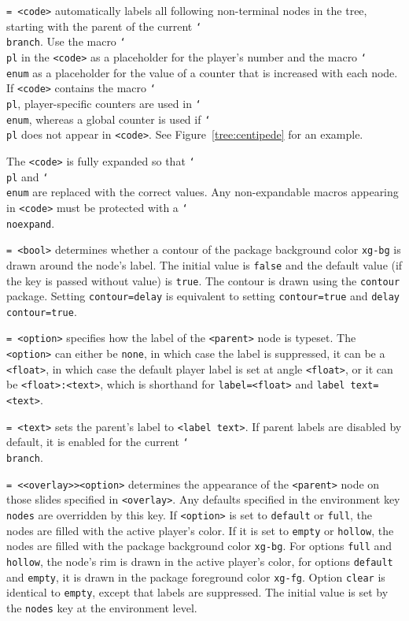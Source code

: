 \documentclass{article}
\newenvironment{desc}{\itemize[leftmargin=50pt]}{\enditemize}
\def\option#1#2{\item[\texttt{#1}] \hskip-1.5pt\texttt{#2}}
\renewcommand{\textbackslash}{\char`\\}
\def\cmd#1{\texttt{\color{cmd}\textbackslash#1}}
\begin{document}
\begin{desc}
\option{autolabel}{= <code>} automatically labels all following non-terminal nodes in the tree, starting with the parent of the current \cmd{branch}. Use the macro \cmd{pl} in the \texttt{<code>} as a placeholder for the player's number and the macro \cmd{enum} as a placeholder for the value of a counter that is increased with each node. If \texttt{<code>} contains the macro \cmd{pl}, player-specific counters are used in \cmd{enum}, whereas a global counter is used if \cmd{pl} does not appear in \texttt{<code>}. See Figure~\ref{tree:centipede} for an example.

{\color{player4}The \texttt{<code>} is fully expanded so that \cmd{pl} and \cmd{enum} are replaced with the correct values. Any non-expandable macros appearing in \texttt{<code>} must be protected with a \cmd{noexpand}.}

\option{contour}{= <bool>} determines whether a contour of the package background color \texttt{xg-bg} is drawn around the node's label. The initial value is \texttt{false} and the default value (if the key is passed without value) is \texttt{true}. The contour is drawn using the \texttt{contour} package. Setting \texttt{contour=delay} is equivalent to setting \texttt{contour=true} and \texttt{delay contour=true}.%

\option{label}{= <option>} specifies how the label of the \texttt{<parent>} node is typeset. The \texttt{<option>} can either be \texttt{none}, in which case the label is suppressed, it can be a \texttt{<float>}, in which case the default player label is set at angle \texttt{<float>}, or it can be \texttt{<float>:<text>}, which is shorthand for \texttt{label=<float>} and \texttt{label text=<text>}. %

\option{label text}{= <text>} sets the parent's label to \texttt{<label text>}. If parent labels are disabled by default, it is enabled for the current \cmd{branch}.

\option{node}{= <<overlay>><option>} determines the appearance of the \texttt{<parent>} node on those slides specified in \texttt{<overlay>}. Any defaults specified in the environment key \texttt{nodes} are overridden by this key. If \texttt{<option>} is set to \texttt{default} or \texttt{full}, the nodes are filled with the active player's color. If it is set to \texttt{empty} or \texttt{hollow}, the nodes are filled with the package background color \texttt{xg-bg}. For options \texttt{full} and \texttt{hollow}, the node's rim is drawn in the active player's color, for options \texttt{default} and \texttt{empty}, it is drawn in the package foreground color \texttt{xg-fg}. Option \texttt{clear} is identical to \texttt{empty}, except that labels are suppressed. The initial value is set by the \texttt{nodes} key at the environment level.


\end{desc}
\end{document}
